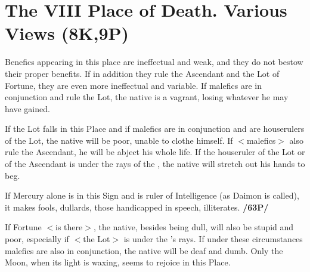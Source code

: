 \section{The VIII Place of Death. Various Views (8K,9P)}

Benefics appearing in this place are ineffectual and weak, and they do not bestow their proper benefits. If in addition they rule the Ascendant and the Lot of Fortune, they are even more ineffectual and variable. If malefics are in conjunction and rule the Lot, the native is a vagrant, losing whatever he may have gained.

If the Lot falls in this Place and if malefics are in conjunction and are houserulers of the Lot, the native will be poor, unable to clothe himself. If $<$malefics$>$ also rule the Ascendant, he will be abject his whole life. If the houseruler of the Lot or of the Ascendant is under the rays of the \Sun, the native will stretch out his hands to beg. 

If Mercury alone is in this Sign and is ruler of Intelligence (as Daimon is called), it makes fools, dullards, those handicapped in speech, illiterates. \textbf{/63P/}

If Fortune $<$is there$>$, the native, besides being dull, will also be stupid and poor, especially if $<$the Lot$>$ is under the \Sun's rays. If under these circumstances malefics are also in conjunction, the native will be deaf and dumb. Only the Moon, when its light is waxing, seems to rejoice in this Place.

\newpage